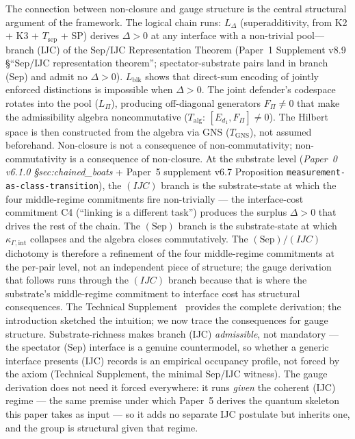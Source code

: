 \documentclass[11pt]{article}
\begin{document}
The connection between non-closure and gauge structure is the central structural argument of the framework.  The logical chain runs: $L_\Delta$ (superadditivity, from K2 + K3 + $T_{\mathrm{sep}}$ + SP) derives $\Delta > 0$ at any interface with a non-trivial pool---branch (IJC) of the Sep/IJC Representation Theorem (Paper~1 Supplement v8.9 \S``Sep/IJC representation theorem''; spectator-substrate pairs land in branch (Sep) and admit no $\Delta > 0$).  $L_{\mathrm{blk}}$ shows that direct-sum encoding of jointly enforced distinctions is impossible when $\Delta > 0$.  The joint defender's codespace rotates into the pool ($L_\Pi$), producing off-diagonal generators $F_\Pi \ne 0$ that make the admissibility algebra noncommutative ($T_{\mathrm{alg}}$: $[E_{d_1}, F_\Pi] \ne 0$).  The Hilbert space is then constructed from the algebra via GNS ($T_{\mathrm{GNS}}$), not assumed beforehand.  Non-closure is not a consequence of non-commutativity; non-commutativity is a consequence of non-closure.  At the substrate level (\emph{Paper~0 v6.1.0 \S sec:chained\_boats} + Paper~5 supplement v6.7 Proposition \texttt{measurement-as-class-transition}), the $(IJC)$ branch is the substrate-state at which the four middle-regime commitments fire non-trivially --- the interface-cost commitment C4 (``linking is a different task'') produces the surplus $\Delta > 0$ that drives the rest of the chain. The $(\mathrm{Sep})$ branch is the substrate-state at which $\kappa_{\Gamma,\mathrm{int}}$ collapses and the algebra closes commutatively. The $(\mathrm{Sep})/(IJC)$ dichotomy is therefore a refinement of the four middle-regime commitments at the per-pair level, not an independent piece of structure; the gauge derivation that follows runs through the $(IJC)$ branch because that is where the substrate's middle-regime commitment to interface cost has structural consequences.  The Technical Supplement~\cite{BrookeSupplement} provides the complete derivation; the introduction sketched the intuition; we now trace the consequences for gauge structure.  Substrate-richness makes branch (IJC) \emph{admissible}, not mandatory --- the spectator (Sep) interface is a genuine countermodel, so whether a generic interface presents (IJC) records is an empirical occupancy profile, not forced by the axiom (Technical Supplement, the minimal Sep/IJC witness).  The gauge derivation does not need it forced everywhere: it runs \emph{given} the coherent (IJC) regime --- the same premise under which Paper~5 derives the quantum skeleton this paper takes as input --- so it adds no separate IJC postulate but inherits one, and the group is structural given that regime.
\end{document}
